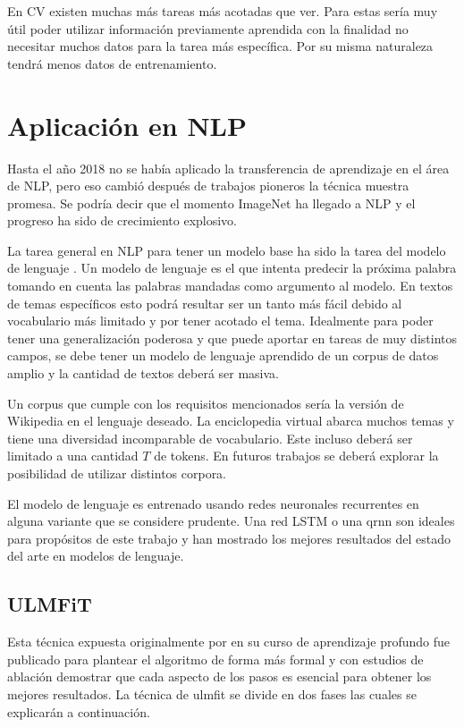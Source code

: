 En CV existen muchas más tareas más acotadas que ver. Para estas sería muy útil poder utilizar información previamente aprendida con la finalidad no necesitar muchos datos para la tarea más específica. Por su misma naturaleza tendrá menos datos de entrenamiento.

\section{Aplicación en NLP}

Hasta el año 2018 no se había aplicado la transferencia de aprendizaje en el área de NLP, pero eso cambió después de trabajos pioneros \parencite{peters:2018, howard2018, devlin2018bert} la técnica muestra promesa. Se podría decir que el momento ImageNet ha llegado a NLP y el progreso ha sido de crecimiento explosivo.

La tarea general en NLP para tener un modelo base ha sido la tarea del modelo de lenguaje \parencite{howard2018}. Un modelo de lenguaje es el que intenta predecir la próxima palabra tomando en cuenta las palabras mandadas como argumento al modelo. En textos de temas específicos esto podrá resultar ser un tanto más fácil debido al vocabulario más limitado y por tener acotado el tema. Idealmente para poder tener una generalización poderosa y que puede aportar en tareas de muy distintos campos, se debe tener un modelo de lenguaje aprendido de un corpus de datos amplio y la cantidad de textos deberá ser masiva.

Un corpus que cumple con los requisitos mencionados sería la versión de Wikipedia en el lenguaje deseado. La enciclopedia virtual abarca muchos temas y tiene una diversidad incomparable de vocabulario. Este incluso deberá ser limitado a una cantidad $T$ de tokens. En futuros trabajos se deberá explorar la posibilidad de utilizar distintos corpora.

El modelo de lenguaje es entrenado usando redes neuronales recurrentes en alguna variante que se considere prudente. Una red LSTM o una \gls{qrnn} \parencite{bradbury2016} son ideales para propósitos de este trabajo y han mostrado los mejores resultados del estado del arte en modelos de lenguaje.

\subsection{ULMFiT}

Esta técnica expuesta originalmente por \textcite{howard2018} en su curso de aprendizaje profundo fue publicado para plantear el algoritmo de forma más formal y con estudios de ablación demostrar que cada aspecto de los pasos es esencial para obtener los mejores resultados. La técnica de \gls{ulmfit} se divide en dos fases \parencite{howard2018} las cuales se explicarán a continuación.

